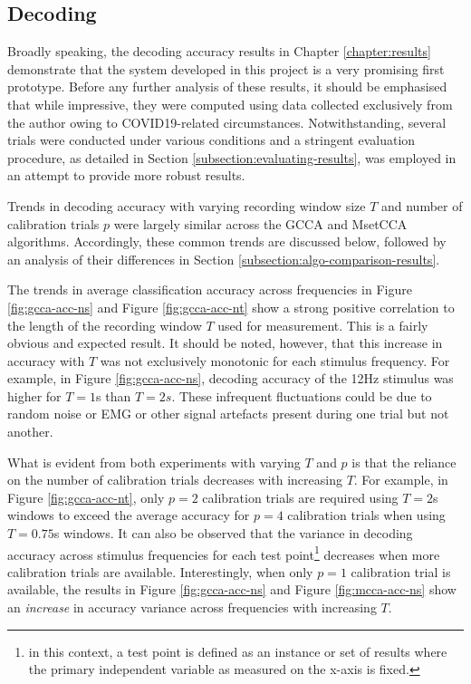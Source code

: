 \subsection{Decoding}
Broadly speaking, the decoding accuracy results in Chapter \ref{chapter:results} demonstrate that the system developed in this project is a very promising first prototype. Before any further analysis of these results, it should be emphasised that while impressive, they were computed using data collected exclusively from the author owing to COVID19-related circumstances. Notwithstanding, several trials were conducted under various conditions and a stringent evaluation procedure, as detailed in Section \ref{subsection:evaluating-results}, was employed in an attempt to provide more robust results. 

Trends in decoding accuracy with varying recording window size $T$ and number of calibration trials $p$ were largely similar across the GCCA and MsetCCA algorithms. Accordingly, these common trends are discussed below, followed by an analysis of their differences in Section \ref{subsection:algo-comparison-results}.

The trends in average classification accuracy across frequencies in Figure \ref{fig:gcca-acc-ns} and Figure \ref{fig:gcca-acc-nt} show a strong positive correlation to the length of the recording window $T$ used for measurement. This is a fairly obvious and expected result. It should be noted, however, that this increase in accuracy with $T$ was not exclusively monotonic for each stimulus frequency. For example, in Figure \ref{fig:gcca-acc-ns}, decoding accuracy of the 12Hz stimulus was higher for $T=1$s than $T=2s$. These infrequent fluctuations could be due to random noise or EMG or other signal artefacts present during one trial but not another. 

What is evident from both experiments with varying $T$ and $p$ is that the reliance on the number of calibration trials decreases with increasing $T$. For example, in Figure \ref{fig:gcca-acc-nt}, only $p=2$ calibration trials are required using $T=2$s windows to exceed the average accuracy for $p=4$ calibration trials when using $T=0.75$s windows. It can also be observed that the variance in decoding accuracy across stimulus frequencies for each test point\footnote{in this context, a test point is defined as an instance or set of results where the primary independent variable as measured on the x-axis is fixed. } decreases when more calibration trials are available. Interestingly, when only $p=1$ calibration trial is available, the results in Figure \ref{fig:gcca-acc-ns} and Figure \ref{fig:mcca-acc-ns} show an \textit{increase} in accuracy variance across frequencies with increasing $T$. 

